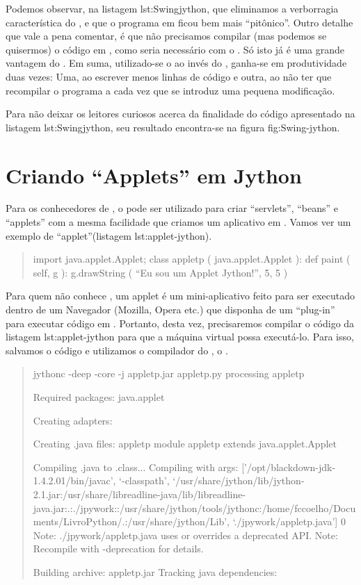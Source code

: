 \documentclass[a4paper,10pt,portuguese]{sphinxmanual}
\begin{document}
Podemos observar, na listagem lst:Swingjython, que eliminamos a
verborragia característica do , e que o programa em
 ficou bem mais ``pitônico''. Outro detalhe que vale a pena
comentar, é que não precisamos compilar (mas podemos se quisermos)
o código em , como seria necessário com o . Só
isto já é uma grande vantagem do . Em suma, utilizado-se
o  ao invés do , ganha-se em produtividade duas
vezes: Uma, ao escrever menos linhas de código e outra, ao não ter
que recompilar o programa a cada vez que se introduz uma pequena
modificação.

Para não deixar os leitores curiosos acerca da finalidade do código
apresentado na listagem lst:Swingjython, seu resultado encontra-se
na figura fig:Swing-jython.


\section{Criando ``Applets'' em Jython}
\label{capext:criando-applets-em-jython}
Para os conhecedores de , o  pode ser utilizado
para criar ``servlets'', ``beans'' e ``applets'' com a mesma facilidade
que criamos um aplicativo em . Vamos ver um exemplo de
``applet''(listagem lst:applet-jython).
\begin{quote}

import java.applet.Applet; class appletp ( java.applet.Applet ):
def paint ( self, g ): g.drawString ( ``Eu sou um Applet Jython!'',
5, 5 )
\end{quote}

Para quem não conhece , um applet é um mini-aplicativo
feito para ser executado dentro de um Navegador (Mozilla, Opera
etc.) que disponha de um ``plug-in'' para executar código em
. Portanto, desta vez, precisaremos compilar o código da
listagem lst:applet-jython para que a máquina virtual 
possa executá-lo. Para isso, salvamos o código e utilizamos o
compilador do , o .
\begin{quote}

jythonc -deep -core -j appletp.jar appletp.py processing appletp

Required packages: java.applet

Creating adapters:

Creating .java files: appletp module appletp extends
java.applet.Applet

Compiling .java to .class... Compiling with args:
{[}'/opt/blackdown-jdk-1.4.2.01/bin/javac', `-classpath',
`/usr/share/jython/lib/jython-2.1.jar:/usr/share/libreadline-java/lib/libreadline-java.jar:.:./jpywork::/usr/share/jython/tools/jythonc:/home/fccoelho/Documents/LivroPython/.:/usr/share/jython/Lib',
`./jpywork/appletp.java'{]} 0 Note: ./jpywork/appletp.java uses or
overrides a deprecated API. Note: Recompile with -deprecation for
details.

Building archive: appletp.jar Tracking java dependencies:
\end{quote}
\end{document}

